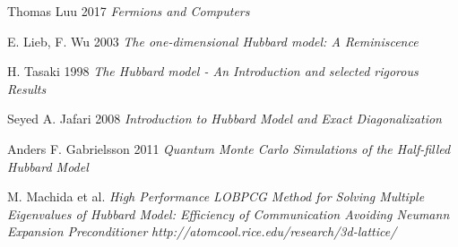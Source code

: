  
\begin{thebibliography}{9}
	
	Thomas Luu 2017
	\textit{Fermions and Computers}
	
	E. Lieb, F. Wu 2003
	\textit{The one-dimensional Hubbard model: A Reminiscence}
	
	H. Tasaki 1998
	\textit{The Hubbard model - An Introduction and selected rigorous Results}
	
	Seyed A. Jafari 2008
	\textit{Introduction to Hubbard Model and Exact Diagonalization}
	
	Anders F. Gabrielsson 2011
	\textit{Quantum Monte Carlo Simulations of
		the Half-filled Hubbard Model}
	
	M. Machida et al. \textit{High Performance LOBPCG Method for Solving Multiple Eigenvalues of Hubbard Model: Efficiency of Communication Avoiding Neumann Expansion Preconditioner}
	\textit{http://atomcool.rice.edu/research/3d-lattice/}
\end{thebibliography}
\clearpage
